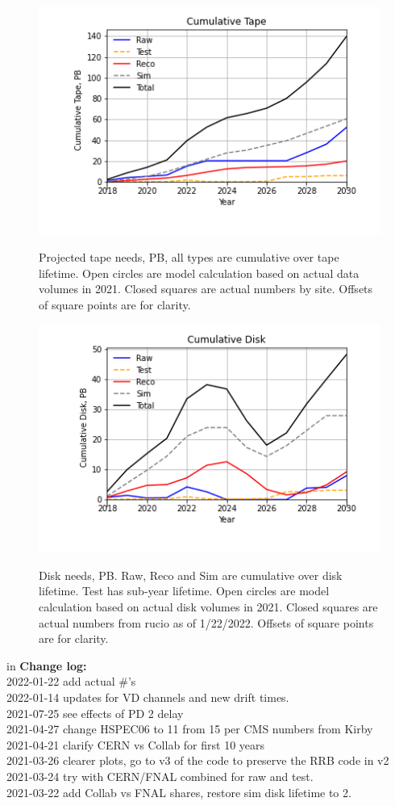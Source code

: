 \documentclass[12pt]{article}
\begin{document}
\begin{figure}
\centering\includegraphics[height=0.4\textwidth]{Cumulative-Tape.png}\label{CumulativeTape}
\caption{Projected  tape needs, PB, all types are cumulative over tape lifetime. Open circles are model calculation based on actual data volumes in 2021. Closed squares are actual numbers by site. Offsets of square points are for clarity.}
\end{figure}
\begin{figure}
\centering\includegraphics[height=0.4\textwidth]{Cumulative-Disk}\label{CumulativeDisk}
\caption{Disk needs, PB.  Raw, Reco and Sim are cumulative over disk lifetime.  Test has sub-year lifetime.  Open circles are model calculation based on actual disk volumes in 2021. Closed squares are actual numbers from rucio as of 1/22/2022. Offsets of square points are for clarity.}
\end{figure}
 in\pagebreak 
 {\bf Change log:}\\
2022-01-22 add actual #'s\\2022-01-14 updates for VD channels and new drift times.\\2021-07-25 see effects of PD 2 delay\\2021-04-27 change HSPEC06 to 11 from 15 per CMS numbers from Kirby\\2021-04-21 clarify CERN vs Collab for first 10 years\\2021-03-26 clearer plots, go to v3 of the code to preserve the RRB code in v2\\2021-03-24 try with CERN/FNAL combined for raw and test.\\2021-03-22 add Collab vs FNAL shares, restore sim disk lifetime to 2.\\
\end{document}
